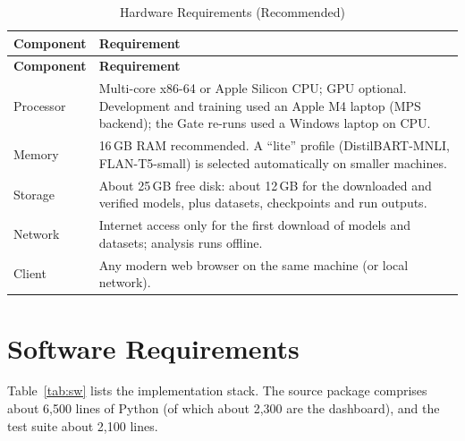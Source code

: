 \documentclass[12pt,a4paper,oneside]{report}
\begin{document}
\begin{longtable}{|L{4cm}|L{10.2cm}|}
\caption{Hardware Requirements (Recommended)}\label{tab:hw}\\
\hline
\textbf{Component} & \textbf{Requirement}\\ \hline\endfirsthead
\hline \textbf{Component} & \textbf{Requirement}\\ \hline\endhead
Processor & Multi-core x86-64 or Apple Silicon CPU; GPU optional. Development and training used an Apple M4 laptop
(MPS backend); the Gate re-runs used a Windows laptop on CPU.\\ \hline
Memory & 16\,GB RAM recommended. A ``lite'' profile (DistilBART-MNLI, FLAN-T5-small) is selected automatically on
smaller machines.\\ \hline
Storage & About 25\,GB free disk: about 12\,GB for the downloaded and verified models, plus datasets, checkpoints and
run outputs.\\ \hline
Network & Internet access only for the first download of models and datasets; analysis runs offline.\\ \hline
Client & Any modern web browser on the same machine (or local network).\\ \hline
\end{longtable}

\section{Software Requirements}
Table~\ref{tab:sw} lists the implementation stack. The source package comprises about 6,500 lines of Python (of which
about 2,300 are the dashboard), and the test suite about 2,100 lines.
\end{document}
